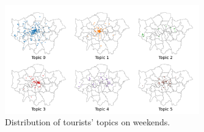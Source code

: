 \documentclass{article}
\theoremstyle{definition}
\theoremstyle{remark}
\begin{document}
\begin{figure}[!h]
\centering
\includegraphics[width=0.75\textwidth]{figures/topics_distribution_weekend_tourists.png}
\caption{\label{fig:topics_distribution_weekend_tourists}Distribution of tourists' topics on weekends.}
\end{figure}
\end{document}
